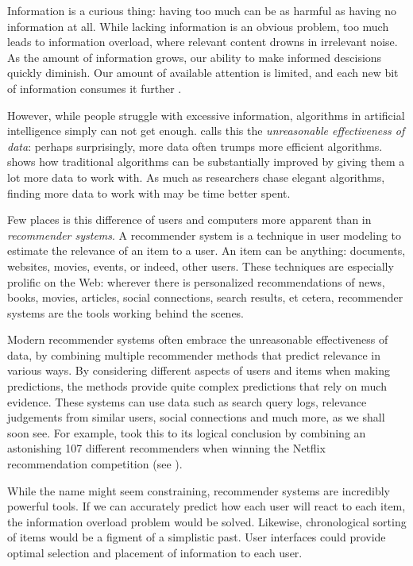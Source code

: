 \label{chap:intro}

Information is a curious thing:
having too much can be as harmful as having no information at all.
While lacking information is an obvious problem,
too much leads to information overload,
where relevant content drowns in irrelevant noise.
As the amount of information grows,
our ability to make informed descisions quickly diminish.
Our amount of available attention is limited, and each new bit
of information consumes it further
\cite[p1]{Davenport2001}.

However, while people struggle with excessive information,
algorithms in artificial intelligence simply can not get enough.
\citet[p1]{Halevy2009} calls this the \emph{unreasonable effectiveness of data}:
perhaps surprisingly, more data often trumps more efficient algorithms.
\citet[p3]{Banko2001} shows how traditional algorithms can be substantially
improved by giving them a lot more data to work with.
As much as researchers chase elegant algorithms,
finding more data to work with may be time better spent.

Few places is this difference of users and computers more apparent than in \emph{recommender systems}.
A recommender system is a technique in user modeling to estimate the relevance of an item to a user.
An item can be anything: documents, websites, movies, events, or indeed, other users.
These techniques are especially prolific on the Web: 
wherever there is personalized recommendations of news, books, movies,
articles, social connections, search results, et cetera, recommender systems are the tools
working behind the scenes.

Modern recommender systems often embrace the unreasonable effectiveness of data,
by combining multiple recommender methods that predict relevance in various ways.
By considering different aspects of users and items when making predictions,
the methods provide quite complex predictions that rely on much evidence.
These systems can use data such as search query logs, relevance judgements from similar users,
social connections and much more, as we shall soon see.
For example, \citet[p1]{Bell2007} took this to its logical conclusion by 
combining an astonishing 107 different recommenders when winning the Netflix recommendation competition
(see \citet{Linden2009}).

While the name might seem constraining, recommender systems are incredibly powerful tools.
If we can accurately predict how each user will react to each item, the information overload problem would be solved.
Likewise, chronological sorting of items would be a figment of a simplistic past.
User interfaces could provide optimal selection and placement of information to each user.

